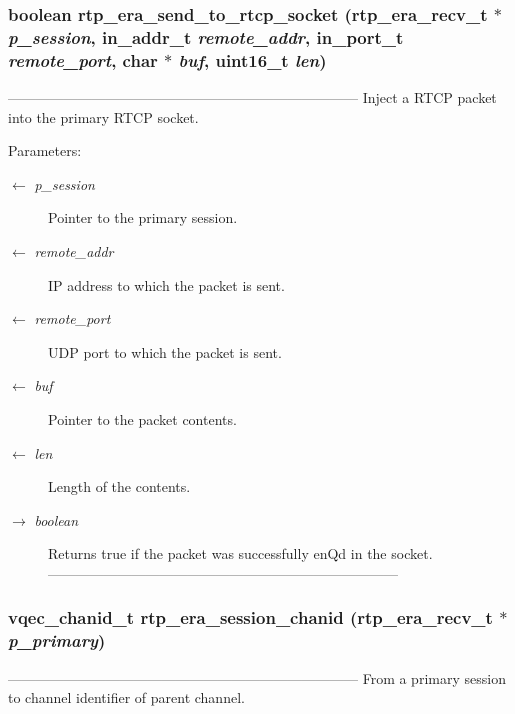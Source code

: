 \subsubsection{\setlength{\rightskip}{0pt plus 5cm}boolean rtp\_\-era\_\-send\_\-to\_\-rtcp\_\-socket (\bf{rtp\_\-era\_\-recv\_\-t} $\ast$ {\em p\_\-session}, in\_\-addr\_\-t {\em remote\_\-addr}, in\_\-port\_\-t {\em remote\_\-port}, char $\ast$ {\em buf}, uint16\_\-t {\em len})}\label{rtp__era__recv_8h_d258d31a1cf483004011f7bd93de0cfd}


--------------------------------------------------------------------------- Inject a RTCP packet into the primary RTCP socket.

\begin{Desc}
\item[Parameters:]
\begin{description}
\item[\mbox{$\leftarrow$} {\em p\_\-session}]Pointer to the primary session. \item[\mbox{$\leftarrow$} {\em remote\_\-addr}]IP address to which the packet is sent. \item[\mbox{$\leftarrow$} {\em remote\_\-port}]UDP port to which the packet is sent. \item[\mbox{$\leftarrow$} {\em buf}]Pointer to the packet contents. \item[\mbox{$\leftarrow$} {\em len}]Length of the contents. \item[\mbox{$\rightarrow$} {\em boolean}]Returns true if the packet was successfully en\-Qd in the socket. --------------------------------------------------------------------------- \end{description}
\end{Desc}
\subsubsection{\setlength{\rightskip}{0pt plus 5cm}\bf{vqec\_\-chanid\_\-t} rtp\_\-era\_\-session\_\-chanid (\bf{rtp\_\-era\_\-recv\_\-t} $\ast$ {\em p\_\-primary})}\label{rtp__era__recv_8h_6b471ba50a286d9745e0e4445c0efe07}


--------------------------------------------------------------------------- From a primary session to channel identifier of parent channel.

